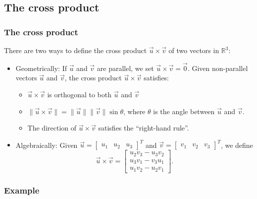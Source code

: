 \documentclass[11pt,t]{beamer}
\newcommand{\R}{\mathbb{R}}
\newcommand{\len}[1]{\lVert #1\rVert}
\begin{document}
\subsection{The cross product}
\begin{frame}\frametitle{The cross product}
 There are two ways to define the \alert{cross product} $\vec{u}\times \vec{v}$ of two vectors in $\R^3$:
\begin{itemize}
 \item Geometrically: If $\vec{u}$ and $\vec{v}$ are parallel, we set $\vec{u}\times\vec{v}=\vec{0}$. Given non-parallel vectors $\vec{u}$ and $\vec{v}$, the cross product $\vec{u}\times \vec{v}$ satisfies:
\begin{itemize}
 \item $\vec{u}\times \vec{v}$ is orthogonal to both $\vec{u}$ and $\vec{v}$
 \item $\len{\vec{u}\times \vec{v}} = \len{\vec{u}}\len{\vec{v}}\sin\theta$, where $\theta$ is the angle between $\vec{u}$ and $\vec{v}$.
 \item The direction of $\vec{u}\times \vec{v}$ satisfies the ``right-hand rule''.
\end{itemize}
 \item Algebraically: Given $\vec{u}=\begin{bmatrix}u_1&u_2&u_3\end{bmatrix}^T$ and $\vec{v}=\begin{bmatrix}v_1&v_2&v_3\end{bmatrix}^T$, we define
\[
 \vec{u}\times \vec{v} = \begin{bmatrix}u_2v_3-u_3v_2\\u_3v_1-v_3u_1\\u_1v_2-u_2v_1\end{bmatrix}.
\]

\end{itemize}

\end{frame}
\begin{frame}\frametitle{Example}
 
\end{frame}
\end{document}
